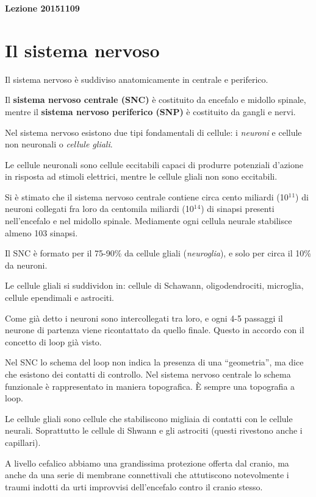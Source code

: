 \documentclass[]{article}
\begin{document}
\textbf{Lezione 20151109}

\section{Il sistema nervoso}\label{il-sistema-nervoso}

Il sistema nervoso è suddiviso anatomicamente in centrale e periferico.

Il \textbf{sistema nervoso centrale (SNC)} è costituito da encefalo e
midollo spinale, mentre il \textbf{sistema nervoso periferico (SNP)} è
costituito da gangli e nervi.

Nel sistema nervoso esistono due tipi fondamentali di cellule: i
\emph{neuroni} e cellule non neuronali o \emph{cellule gliali}.

Le cellule neuronali sono cellule eccitabili capaci di produrre
potenziali d'azione in risposta ad stimoli elettrici, mentre le cellule
gliali non sono eccitabili.

Si è stimato che il sistema nervoso centrale contiene circa cento
miliardi (10\(^1\)\(^1\)) di neuroni collegati fra loro da centomila
miliardi (10\(^1\)\(^4\)) di sinapsi presenti nell'encefalo e nel
midollo spinale. Mediamente ogni cellula neurale stabilisce almeno 103
sinapsi.

Il SNC è formato per il 75-90\% da cellule gliali (\emph{neuroglia}), e
solo per circa il 10\% da neuroni.

Le cellule gliali si suddividon in: cellule di Schawann,
oligodendrociti, microglia, cellule ependimali e astrociti.

Come già detto i neuroni sono intercollegati tra loro, e ogni 4-5
passaggi il neurone di partenza viene ricontattato da quello finale.
Questo in accordo con il concetto di loop già visto.

Nel SNC lo schema del loop non indica la presenza di una ``geometria'',
ma dice che esistono dei contatti di controllo. Nel sistema nervoso
centrale lo schema funzionale è rappresentato in maniera topografica. È
sempre una topografia a loop.

Le cellule gliali sono cellule che stabiliscono migliaia di contatti con
le cellule neurali. Soprattutto le cellule di Shwann e gli astrociti
(questi rivestono anche i capillari).

A livello cefalico abbiamo una grandissima protezione offerta dal
cranio, ma anche da una serie di membrane connettivali che attutiscono
notevolmente i traumi indotti da urti improvvisi dell'encefalo contro il
cranio stesso.
\end{document}

